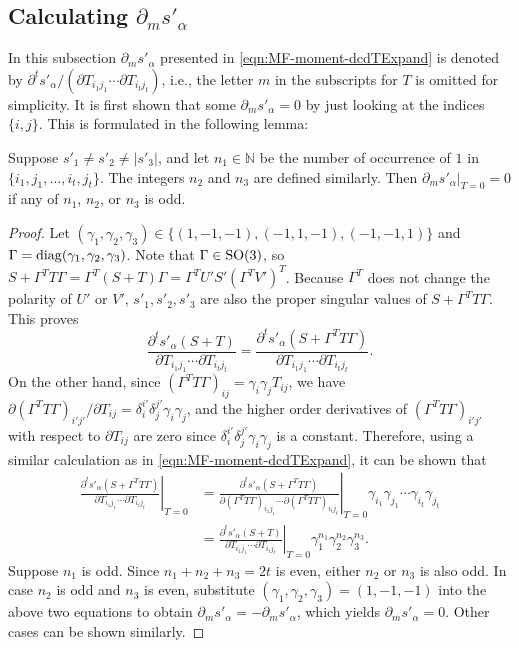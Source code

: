 \subsection{Calculating $\partial_m s'_\alpha$}

In this subsection $\partial_m s'_\alpha$ presented in \eqref{eqn:MF-moment-dcdTExpand} is denoted by $\partial^t s'_\alpha / \left( \partial T_{i_1j_1} \cdots \partial T_{i_tj_t} \right)$, i.e.,  the letter $m$ in the subscripts for $T$ is omitted for simplicity.
It is first shown that some $\partial_m s'_\alpha = 0$ by just looking at the indices $\{i,j\}$.
This is formulated in the following lemma:
\begin{lemma} \label{lemma:MF-moment-dsdT-zero}
	Suppose $s'_1 \neq s'_2 \neq |s'_3|$, and let $n_1\in\mathbb{N}$ be the number of occurrence of $1$ in $\{i_1,j_1,\ldots,i_t,j_t\}$.
	The integers $n_2$ and $n_3$ are defined similarly. 
	Then  $\left. \partial_m s'_\alpha \right|_{T=0} = 0$ if any of $n_1$, $n_2$, or $n_3$ is odd.
\end{lemma}
\begin{proof}
	Let $(\gamma_1,\gamma_2,\gamma_3) \in \{(1,-1,-1),(-1,1,-1),(-1,-1,1)\}$ and $\Gamma = \mathrm{diag}(\gamma_1,\gamma_2,\gamma_3)$.
	Note that $\Gamma\in\mathrm{SO}(3)$, so $S+\Gamma^TT\Gamma = \Gamma^T(S+T)\Gamma = \Gamma^TU'S'(\Gamma^TV')^T$.
	Because $\Gamma^T$ does not change the polarity of $U'$ or $V'$, $s'_1,s'_2,s'_3$ are also the proper singular values of $S+\Gamma^TT\Gamma$.
	This proves
	\begin{equation*}
		\frac{\partial^t s'_\alpha(S+T)}{\partial T_{i_1j_1} \cdots \partial T_{i_tj_t}} = \frac{\partial^t s'_\alpha(S+\Gamma^TT\Gamma)}{\partial T_{i_1j_1} \cdots \partial T_{i_tj_t}}.
	\end{equation*}
	On the other hand, since $(\Gamma^TT\Gamma)_{ij} = \gamma_i\gamma_jT_{ij}$, we have $\partial (\Gamma^TT\Gamma)_{i'j'} / \partial T_{ij} = \delta_i^{i'}\delta_j^{j'}\gamma_i\gamma_j$, and the higher order derivatives of $(\Gamma^TT\Gamma)_{i'j'}$ with respect to $\partial T_{ij}$ are zero since $\delta_i^{i'}\delta_j^{j'}\gamma_i\gamma_j$ is a constant. 
	Therefore, using a similar calculation as in \eqref{eqn:MF-moment-dcdTExpand}, it can be shown that
	\begin{align*}
		\left. \frac{\partial^t s'_\alpha(S+\Gamma^TT\Gamma)}{\partial T_{i_1j_1} \cdots \partial T_{i_tj_t}} \right|_{T=0} &= \left. \frac{\partial^t s'_\alpha(S+\Gamma^TT\Gamma)}{\partial (\Gamma^TT\Gamma)_{i_1j_1} \cdots \partial (\Gamma^TT\Gamma)_{i_tj_t}} \right|_{T=0} \gamma_{i_1}\gamma_{j_1} \cdots \gamma_{i_t}\gamma_{j_t} \\
		&= \left. \frac{\partial^t s'_\alpha(S+T)}{\partial T_{i_1j_1} \cdots \partial T_{i_tj_t}} \right|_{T=0} \gamma_1^{n_1} \gamma_2^{n_2} \gamma_3^{n_3}.
	\end{align*}
	Suppose $n_1$ is odd. 
	Since $n_1+n_2+n_3 = 2t$ is even, either $n_2$ or $n_3$ is also odd.
	In case $n_2$ is odd and $n_3$ is even, substitute $(\gamma_1,\gamma_2,\gamma_3) = (1,-1,-1)$ into the above two equations to obtain $\partial_m s'_\alpha = -\partial_m s'_\alpha$, which yields $\partial_m s'_\alpha = 0$.
	Other cases can be shown similarly. 
\end{proof}

